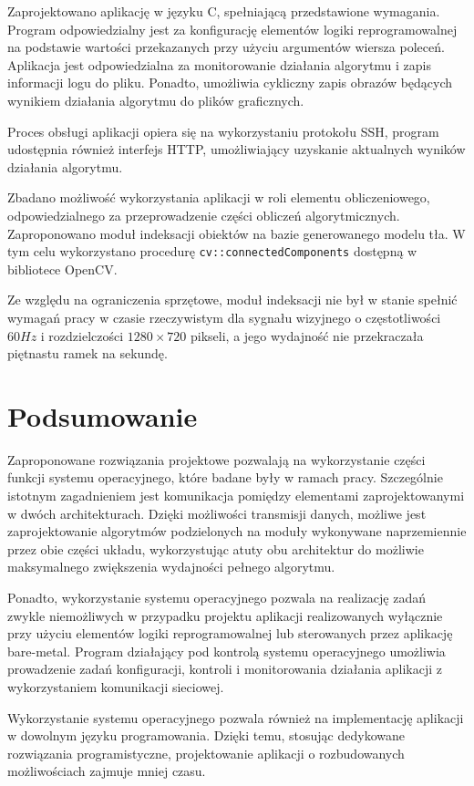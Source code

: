 Zaprojektowano aplikację w języku C, spełniającą przedstawione wymagania.
Program odpowiedzialny jest za konfigurację elementów logiki reprogramowalnej na podstawie wartości przekazanych przy użyciu argumentów wiersza poleceń. Aplikacja jest odpowiedzialna za monitorowanie działania algorytmu i zapis informacji logu do pliku. Ponadto, umożliwia cykliczny zapis obrazów będących wynikiem działania algorytmu do plików graficznych. 

Proces obsługi aplikacji opiera się na wykorzystaniu protokołu SSH, program udostępnia również interfejs HTTP, umożliwiający uzyskanie aktualnych wyników działania algorytmu.

Zbadano możliwość wykorzystania aplikacji w roli elementu obliczeniowego, odpowiedzialnego za przeprowadzenie części obliczeń algorytmicznych. Zaproponowano moduł indeksacji obiektów na bazie generowanego modelu tła. W tym celu wykorzystano procedurę \texttt{cv::connectedComponents} dostępną w bibliotece OpenCV. 

Ze względu na ograniczenia sprzętowe, moduł indeksacji nie był w stanie spełnić wymagań pracy w czasie rzeczywistym dla sygnału wizyjnego o częstotliwości $60Hz$ i rozdzielczości $1280 \times 720 $ pikseli, a jego wydajność nie przekraczała piętnastu ramek na sekundę.

\section*{Podsumowanie}
Zaproponowane rozwiązania projektowe pozwalają na wykorzystanie części funkcji systemu operacyjnego, które badane były w ramach pracy. Szczególnie istotnym zagadnieniem jest komunikacja pomiędzy elementami zaprojektowanymi w dwóch architekturach. Dzięki możliwości transmisji danych, możliwe jest zaprojektowanie algorytmów podzielonych na moduły wykonywane naprzemiennie przez obie części układu, wykorzystując atuty obu architektur do możliwie maksymalnego zwiększenia wydajności pełnego algorytmu.

Ponadto, wykorzystanie systemu operacyjnego pozwala na realizację zadań zwykle niemożliwych w przypadku projektu aplikacji realizowanych wyłącznie przy użyciu elementów logiki reprogramowalnej lub sterowanych przez aplikację bare-metal. Program działający pod kontrolą systemu operacyjnego umożliwia prowadzenie zadań konfiguracji, kontroli i monitorowania działania aplikacji z wykorzystaniem komunikacji sieciowej.

Wykorzystanie systemu operacyjnego pozwala również na implementację aplikacji w dowolnym języku programowania. Dzięki temu, stosując dedykowane rozwiązania programistyczne, projektowanie aplikacji o rozbudowanych możliwościach zajmuje mniej czasu.

